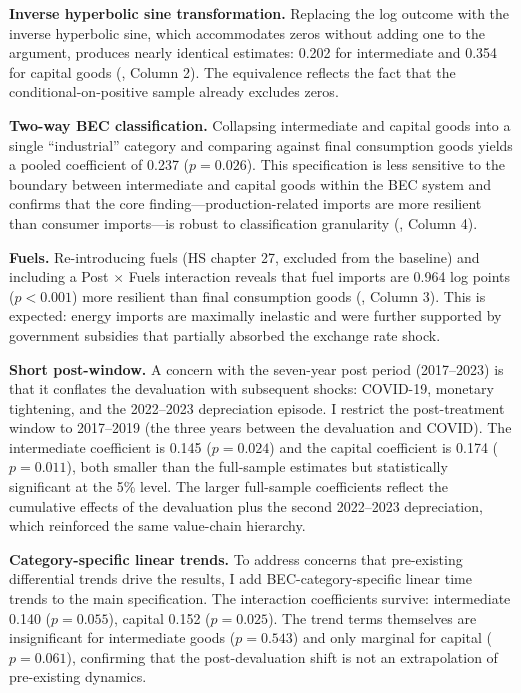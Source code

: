 \documentclass[12pt]{article}
\begin{document}
\textbf{Inverse hyperbolic sine transformation.} Replacing the log outcome with the inverse hyperbolic sine, which accommodates zeros without adding one to the argument, produces nearly identical estimates: 0.202 for intermediate and 0.354 for capital goods (, Column 2). The equivalence reflects the fact that the conditional-on-positive sample already excludes zeros.

\textbf{Two-way BEC classification.} Collapsing intermediate and capital goods into a single ``industrial'' category and comparing against final consumption goods yields a pooled coefficient of 0.237 ($p = 0.026$). This specification is less sensitive to the boundary between intermediate and capital goods within the BEC system and confirms that the core finding---production-related imports are more resilient than consumer imports---is robust to classification granularity (, Column 4).

\textbf{Fuels.} Re-introducing fuels (HS chapter 27, excluded from the baseline) and including a Post $\times$ Fuels interaction reveals that fuel imports are 0.964 log points ($p < 0.001$) more resilient than final consumption goods (, Column 3). This is expected: energy imports are maximally inelastic and were further supported by government subsidies that partially absorbed the exchange rate shock.

\textbf{Short post-window.} A concern with the seven-year post period (2017--2023) is that it conflates the devaluation with subsequent shocks: COVID-19, monetary tightening, and the 2022--2023 depreciation episode. I restrict the post-treatment window to 2017--2019 (the three years between the devaluation and COVID). The intermediate coefficient is 0.145 ($p = 0.024$) and the capital coefficient is 0.174 ($p = 0.011$), both smaller than the full-sample estimates but statistically significant at the 5\% level. The larger full-sample coefficients reflect the cumulative effects of the devaluation plus the second 2022--2023 depreciation, which reinforced the same value-chain hierarchy.

\textbf{Category-specific linear trends.} To address concerns that pre-existing differential trends drive the results, I add BEC-category-specific linear time trends to the main specification. The interaction coefficients survive: intermediate 0.140 ($p = 0.055$), capital 0.152 ($p = 0.025$). The trend terms themselves are insignificant for intermediate goods ($p = 0.543$) and only marginal for capital ($p = 0.061$), confirming that the post-devaluation shift is not an extrapolation of pre-existing dynamics.
\end{document}
